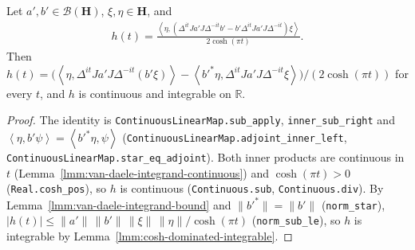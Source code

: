 \begin{lemma}
    \label{lmm:van-daele-commutator-integrand}
    \leanok
    Let $a', b' \in \mathcal{B}(\mathbf{H})$, $\xi, \eta \in \mathbf{H}$, and
    \begin{align}
        h(t) = \frac{\left< \eta, (\Delta^{it}Ja'J\Delta^{-it}b' - b'\Delta^{it}Ja'J\Delta^{-it})\xi \right>}{2\cosh(\pi t)}.
    \end{align}
    Then $h(t) = \big(\left< \eta, \Delta^{it}Ja'J\Delta^{-it}(b'\xi) \right> - \left< b'^*\eta, \Delta^{it}Ja'J\Delta^{-it}\xi \right>\big)/(2\cosh(\pi t))$ for every $t$, and $h$ is continuous and integrable on $\mathbb{R}$.
\end{lemma}
\begin{proof}
    \leanok
    The identity is \texttt{ContinuousLinearMap.sub\_apply}, \texttt{inner\_sub\_right} and $\left< \eta, b'\psi \right> = \left< b'^*\eta, \psi \right>$ (\texttt{ContinuousLinearMap.adjoint\_inner\_left}, \texttt{ContinuousLinearMap.star\_eq\_adjoint}). Both inner products are continuous in $t$ (Lemma~\ref{lmm:van-daele-integrand-continuous}) and $\cosh(\pi t) > 0$ (\texttt{Real.cosh\_pos}), so $h$ is continuous (\texttt{Continuous.sub}, \texttt{Continuous.div}). By Lemma~\ref{lmm:van-daele-integrand-bound} and $\|b'^*\| = \|b'\|$ (\texttt{norm\_star}), $|h(t)| \le \|a'\|\,\|b'\|\,\|\xi\|\,\|\eta\|/\cosh(\pi t)$ (\texttt{norm\_sub\_le}), so $h$ is integrable by Lemma~\ref{lmm:cosh-dominated-integrable}.
\end{proof}

